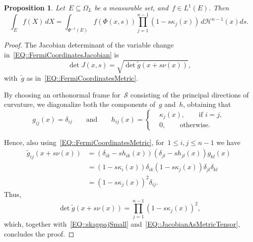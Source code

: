 \documentclass[12pt,a4paper]{amsart}
\numberwithin{equation}{section}
\newtheorem{proposition}[theorem]{Proposition}
\theoremstyle{definition}
\theoremstyle{remark}
\newcommand{\determinant}{\operatorname{det}}
\renewcommand{\leq}{\leqslant}
\begin{document}
\begin{appendix}
\begin{proposition}\label{PROP::FermiCoordinatesJacobian}
    Let~$E \subseteq \Omega_L$ be a measurable set, and~$f \in L^1(E)$. Then
    \begin{equation}\label{EQ::FermiCoordinatesJacobian}
        \int_{E} f(X) \,dX = \int_{\Phi^{-1}(E)} f(\Phi(x,s)) \prod_{j=1}^{n-1}(1 - s\kappa_j(x))\,d\mathcal{H}^{n-1}(x) ds.
    \end{equation}
\end{proposition}

\begin{proof}
    The Jacobian determinant of the variable change in~\eqref{EQ::FermiCoordinatesJacobian} is
    \begin{equation}\label{EQ::JacobianAsMetricTensor}
        \determinant J(x,s) = \sqrt{\determinant \tilde{g}(x + s\nu(x))}\text{,}
    \end{equation}
    with~$\tilde{g}$ as in~\eqref{EQ::FermiCoordinatesMetric}.

    By choosing an orthonormal frame for~$\mathcal{S}$ consisting of the principal directions of curvature, we diagonalize both the components of~$g$ and~$h$, obtaining that
    \begin{equation}
        g_{ij}(x) = \delta_{ij}\qquad \text{and}\qquad h_{ij}(x) = \left\{\begin{aligned}
            &\kappa_j(x),\qquad \text{if }i=j,\\
            &0,\qquad\text{otherwise.}
        \end{aligned}\right.
    \end{equation}
    
    Hence, also using~\eqref{EQ::FermiCoordinatesMetric}, for~$1\leq i,j \leq n-1$ we have
    \begin{align}
        \tilde{g}_{ij}(x + s \nu(x)) &= \left(\delta_{ik} - s h_{ik}(x)\right) \left(\delta_{jl} - s h_{jl}(x)\right) g_{kl}(x)\\
                                     &= (1 - s\kappa_i(x))\delta_{ik} (1 - s\kappa_j(x))\delta_{jl} \delta_{kl}\\
                                     &= {(1 - s\kappa_j(x))}^2 \delta_{ij}\text{.}
    \end{align}
    Thus,
    \begin{equation}
        \determinant \tilde{g}(x + s\nu(x)) = \prod_{j=1}^{n-1}{(1-s\kappa_j(x))}^2\text{,}
    \end{equation}
    which, together with~\eqref{EQ::skappajSmall} and~\eqref{EQ::JacobianAsMetricTensor}, concludes the proof.
\end{proof}


\end{appendix}
\end{document}
